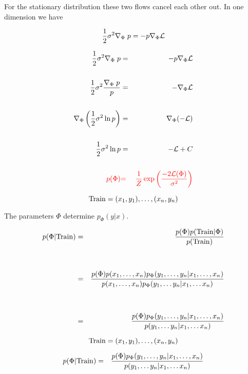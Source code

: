 {\vfill
For the stationary distribution these two flows cancel each other out.
In one dimension we have

$$\frac{1}{2} \sigma^2 \nabla_\Phi\; {p} = - p\nabla_\Phi {\cal L}$$


\vspace{-2ex}
\begin{eqnarray*}
\frac{1}{2} \sigma^2 \nabla_\Phi\; {p} & = & - p\nabla_\Phi {\cal L} \\
\\
\frac{1}{2} \sigma^2 \frac{\nabla_\Phi\;p}{p} & = & - \nabla_\Phi {\cal L} \\
\\
\nabla_\Phi \left(\frac{1}{2} \sigma^2 \ln p\right) & = &  \nabla_\Phi (- {\cal L}) \\
\\
\frac{1}{2} \sigma^2 \ln p & = & - {\cal L} + C \\
\\
{\color{red} p(\Phi)} & {\color{red} =} & {\color{red} \frac{1}{Z}\exp\left(\frac{-2{\cal L}(\Phi)}{\sigma^2}\right)}
\end{eqnarray*}


{\huge
$$\mathrm{Train} = (x_1,y_1),\ldots,(x_n,y_n)$$

\vfill
The parameters $\Phi$ determine $p_\Phi(y|x)$.

\begin{eqnarray*}
p(\Phi|\mathrm{Train}) & = & \frac{p(\Phi)p(\mathrm{Train}|\Phi)}{p(\mathrm{Train})} \\
\\
\\
& = & \frac{p(\Phi)p(x_1,\ldots,x_n)p_\Phi(y_1,\ldots,y_n|x_1,\ldots,x_n)}{p(x_1,\ldots,x_n)p_\Phi(y_1,\ldots y_n|x_1,\ldots x_n)} \\
\\
\\
& = & \frac{p(\Phi)p_\Phi(y_1,\ldots,y_n|x_1,\ldots,x_n)}{p(y_1,\ldots y_n|x_1,\ldots x_n)}
\end{eqnarray*}
}


$$\mathrm{Train} = (x_1,y_1),\ldots,(x_n,y_n)$$

\vfill
{\huge
\begin{eqnarray*}
p(\Phi|\mathrm{Train}) & = & \frac{p(\Phi)p_\Phi(y_1,\ldots,y_n|x_1,\ldots,x_n)}{p(y_1,\ldots y_n|x_1,\ldots x_n)}
\end{eqnarray*}
}

}
